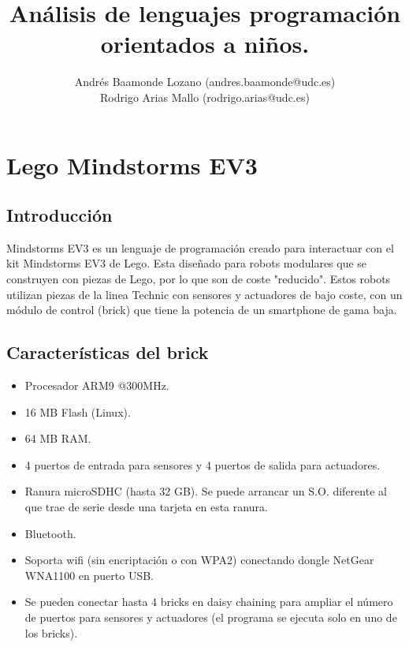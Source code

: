 \documentclass[12pt,a4paper]{article}
\title{Análisis de lenguajes programación orientados a niños.}
\author{Andrés Baamonde Lozano (andres.baamonde@udc.es)\\
	Rodrigo Arias Mallo (rodrigo.arias@udc.es)}
\begin{document}
\maketitle

\clearpage 

\tableofcontents

\clearpage 

\section{Lego Mindstorms EV3}

\subsection{Introducción}

Mindstorms EV3 es un lenguaje de programación creado para interactuar con el kit 
Mindstorms EV3 de Lego. Esta diseñado para robots modulares que se construyen 
con piezas de Lego, por lo que son de coste "reducido". Estos robots utilizan 
piezas de la linea Technic con sensores y actuadores de bajo coste, con un 
módulo de control (brick) que tiene la potencia de un smartphone de gama baja.

\subsection{Características del brick}

\begin{itemize}
\item Procesador ARM9 @300MHz.
\item 16 MB Flash (Linux).
\item 64 MB RAM.
\item 4 puertos de entrada para sensores y 4 puertos de salida para actuadores.
\item Ranura microSDHC (hasta 32 GB). Se puede arrancar un S.O. diferente al que
trae de serie desde una tarjeta en esta ranura.
\item Bluetooth.
\item Soporta wifi (sin encriptación o con WPA2) conectando dongle NetGear
WNA1100 en puerto USB.
\item Se pueden conectar hasta 4 bricks en daisy chaining para ampliar el número
de puertos para sensores y actuadores (el programa se ejecuta solo en uno de los
bricks).
\end{itemize}
\end{document}
